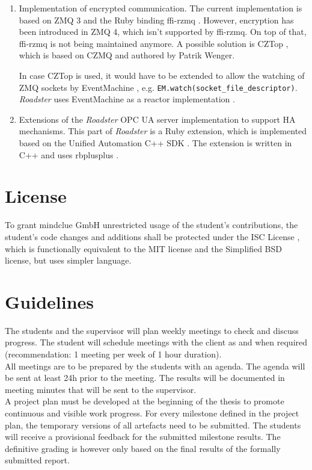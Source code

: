 \documentclass[a4paper]{article}
\newcommand{\rb}[1]{\lstinline[style=customruby]{#1}} %
\begin{document}
\begin{enumerate}
	\item Implementation of encrypted communication. The current
		implementation is based on ZMQ 3 and the Ruby binding ffi-rzmq
		\cite{github:ffi-rzmq}. However, encryption has been introduced
		in ZMQ 4, which isn't supported by ffi-rzmq. On top of that,
		ffi-rzmq is not being maintained anymore. A possible solution
		is CZTop \cite{github:cztop}, which is based on CZMQ
		\cite{czmq} and authored by Patrik Wenger.

		In case CZTop is used, it would have to be extended to allow
		the watching of ZMQ sockets by EventMachine
		\cite{gem:eventmachine}, e.g.
		\rb{EM.watch(socket_file_descriptor)}. \emph{Roadster} uses
		EventMachine as a reactor implementation
		\cite{wiki:reactor-pattern}.

	\item Extensions of the \emph{Roadster} OPC UA server implementation to
		support HA mechanisms. This part of \emph{Roadster} is a Ruby
		extension, which is implemented based on the Unified Automation
		C++ SDK \cite{ua-server-sdk}. The extension is written in C++
		and uses rbplusplus \cite{github:rbplusplus}.
\end{enumerate}

\section{License}
To grant mindclue GmbH unrestricted usage of the student's contributions, the
student's code changes and additions shall be protected under the ISC License
\cite{wiki:isc-license}, which is functionally equivalent to the MIT license
and the Simplified BSD license, but uses simpler language.

\section{Guidelines}
The students and the supervisor will plan weekly meetings to check and discuss
progress. The student will schedule meetings with the client as and when
required (recommendation: 1 meeting per week of 1 hour duration).\\

All meetings are to be prepared by the students with an agenda. The agenda will
be sent at least 24h prior to the meeting. The results will be documented in
meeting minutes that will be sent to the supervisor.\\

A project plan must be developed at the beginning of the thesis to promote
continuous and visible work progress. For every milestone defined in the
project plan, the temporary versions of all artefacts need to be submitted. The
students will receive a provisional feedback for the submitted milestone
results. The definitive grading is however only based on the final results of
the formally submitted report.
\end{document}
